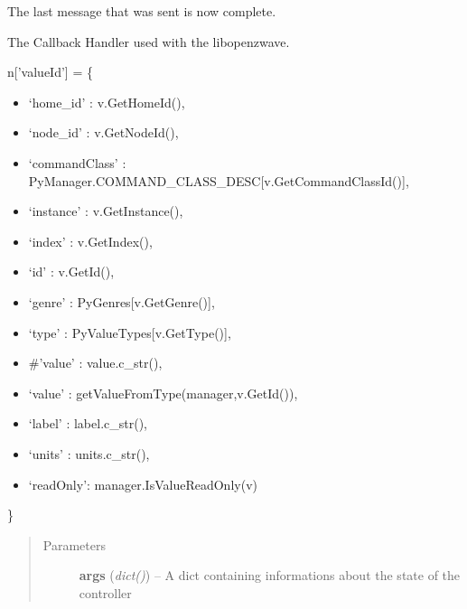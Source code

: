 \documentclass[letterpaper,10pt,english]{sphinxmanual}
\begin{document}
\begin{fulllineitems}
\begin{fulllineitems}
\label{network:openzwave.network.ZWaveNetwork.write_config}
The last message that was sent is now complete.

\end{fulllineitems}


\begin{fulllineitems}
\label{network:openzwave.network.ZWaveNetwork.zwcallback}
The Callback Handler used with the libopenzwave.

n{[}'valueId'{]} = \{
\begin{itemize}
\item {} 
`home\_id' : v.GetHomeId(),

\item {} 
`node\_id' : v.GetNodeId(),

\item {} 
`commandClass' : PyManager.COMMAND\_CLASS\_DESC{[}v.GetCommandClassId(){]},

\item {} 
`instance' : v.GetInstance(),

\item {} 
`index' : v.GetIndex(),

\item {} 
`id' : v.GetId(),

\item {} 
`genre' : PyGenres{[}v.GetGenre(){]},

\item {} 
`type' : PyValueTypes{[}v.GetType(){]},

\item {} 
\#'value' : value.c\_str(),

\item {} 
`value' : getValueFromType(manager,v.GetId()),

\item {} 
`label' : label.c\_str(),

\item {} 
`units' : units.c\_str(),

\item {} 
`readOnly': manager.IsValueReadOnly(v)

\end{itemize}

\}
\begin{quote}\begin{description}
\item[{Parameters}] \leavevmode
\textbf{args} (\emph{dict()}) -- A dict containing informations about the state of the controller

\end{description}\end{quote}

\end{fulllineitems}


\end{fulllineitems}
\end{document}
